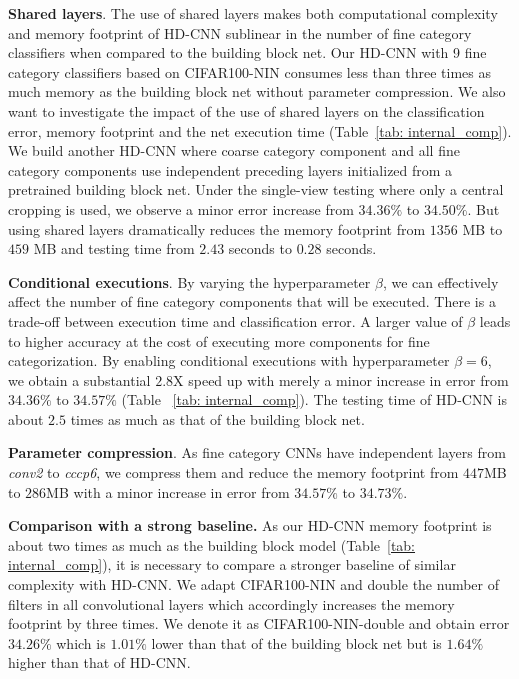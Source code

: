 \documentclass[10pt,twocolumn,letterpaper]{article}
\begin{document}
\noindent \textbf{Shared layers}. The use of shared layers makes both computational complexity and memory footprint of HD-CNN sublinear in the number of fine category classifiers when compared to the building block net.  Our HD-CNN with 9 fine category classifiers based on CIFAR100-NIN consumes less than three times as much memory as the building block net without parameter compression. We also want to investigate the impact of the use of shared layers on the classification error, memory footprint and the net execution time (Table~\ref{tab: internal_comp}). We build  another HD-CNN where coarse category component and all fine category components use independent preceding layers initialized from a pretrained building block net. Under the single-view testing where only a central cropping is used, we observe a minor error increase from $34.36\%$ to $34.50\%$. But using shared layers dramatically reduces the memory footprint from $1356$ MB to $459$ MB and testing time from $2.43$ seconds to $0.28$ seconds.

\noindent \textbf{Conditional executions}. By varying the hyperparameter $\beta$, we can effectively affect the number of fine category components that will be executed. There is a trade-off between execution time and classification error. A larger value of $\beta$ leads to higher accuracy at the cost of executing more components for fine categorization. By enabling conditional executions with hyperparameter $\beta=6$, we obtain a substantial $2.8$X speed up with merely a minor increase in error from $34.36\%$ to $34.57\%$ (Table ~\ref{tab: internal_comp}). The testing time of HD-CNN is about $2.5$ times as much as that of the building block net.

\noindent \textbf{Parameter compression}. As fine category CNNs have independent layers from \textit{conv2} to \textit{cccp6}, we compress them and reduce the memory footprint from $447$MB to $286$MB with a minor increase in error from $34.57\%$ to $34.73\%$.

\noindent \textbf{Comparison with a strong baseline.}
As our HD-CNN memory footprint is about two times as much as the building block model (Table~\ref{tab: internal_comp}), it is necessary to compare a stronger baseline of similar complexity with HD-CNN. We adapt CIFAR100-NIN and double the number of filters in all convolutional layers which accordingly increases the memory footprint by three times. We denote it as CIFAR100-NIN-double and obtain error $34.26\%$ which is $1.01\%$ lower than that of the building block net but is  $1.64\%$ higher than that of HD-CNN.
\end{document}
